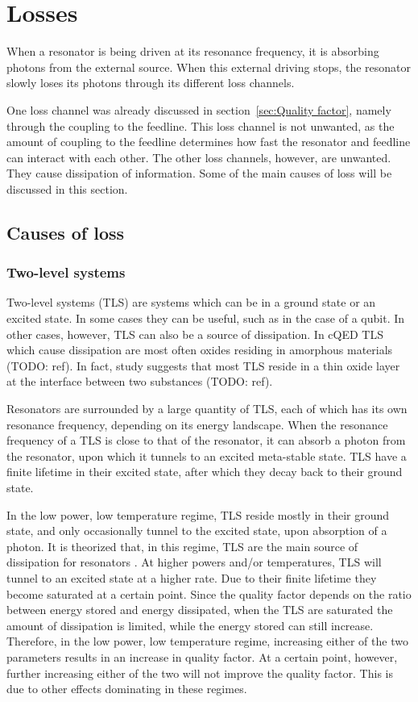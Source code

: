 \documentclass[12pt]{report}
\begin{document}
\section{Losses}

When a resonator is being driven at its resonance frequency, it is absorbing photons from the external source. When this external driving stops, the resonator slowly loses its photons through its different loss channels.

One loss channel was already discussed in section~\ref{sec:Quality factor}, namely through the coupling to the feedline. This loss channel is not unwanted, as the amount of coupling to the feedline determines how fast the resonator and feedline can interact with each other. The other loss channels, however, are unwanted. They cause dissipation of information. Some of the main causes of loss will be discussed in this section.


\subsection{Causes of loss}

\subsubsection{Two-level systems}

Two-level systems (TLS) are systems which can be in a ground state or an excited state. In some cases they can be useful, such as in the case of a qubit. In other cases, however, TLS can also be a source of dissipation. In cQED TLS which cause dissipation are most often oxides residing in amorphous materials (TODO: ref). In fact, study suggests that most TLS reside in a thin oxide layer at the interface between two substances (TODO: ref).

Resonators are surrounded by a large quantity of TLS, each of which has its own resonance frequency, depending on its energy landscape. When the resonance frequency of a TLS is close to that of the resonator, it can absorb a photon from the resonator, upon which it tunnels to an excited meta-stable state. TLS have a finite lifetime in their excited state, after which they decay back to their ground state.

In the low power, low temperature regime, TLS reside mostly in their ground state, and only occasionally tunnel to the excited state, upon absorption of a photon. It is theorized that, in this regime, TLS are the main source of dissipation for resonators \cite{gao2008experimental}. At higher powers and/or temperatures, TLS will tunnel to an excited state at a higher rate. Due to their finite lifetime they become saturated at a certain point. Since the quality factor depends on the ratio between energy stored and energy dissipated, when the TLS are saturated the amount of dissipation is limited, while the energy stored can still increase. Therefore, in the low power, low temperature regime, increasing either of the two parameters results in an increase in quality factor. At a certain point, however, further increasing either of the two will not improve the quality factor. This is due to other effects dominating in these regimes.
\end{document}
